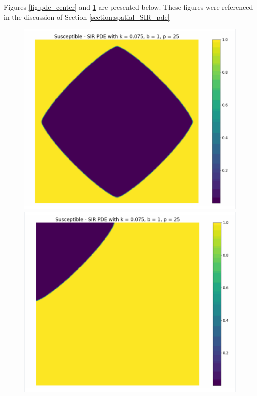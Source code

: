 \documentclass[12pt, reqno]{amsart}
\begin{document}
    Figures \ref{fig:pde_center} and \ref{fig:pde_corner} are presented below. These figures were referenced in the discussion of Section \ref{section:spatial_SIR_pde}
    \begin{figure}[h]
        \centering
        \begin{minipage}[b]{0.45 \textwidth}
            \includegraphics[width=\textwidth]{pde_center_susceptible_snapshot.png}
            \caption{}
            \label{fig:pde_center}
        \end{minipage}
        \hfill
        \begin{minipage}[b]{0.45 \textwidth}
            \includegraphics[width=\textwidth]{pde_corner_susceptible_snapshot.png}
            \caption{}
            \label{fig:pde_corner}
        \end{minipage}
    \end{figure}
\end{document}
